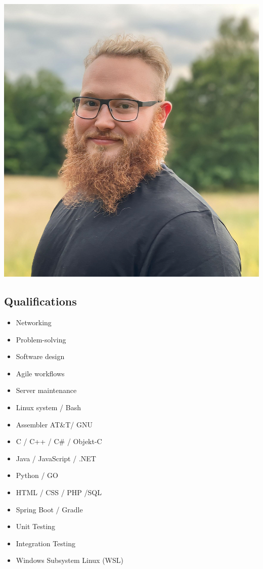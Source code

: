 \documentclass{article}
\begin{document}
	\begin{minipage}[t]{0.28\textwidth}
		\begin{minipage}[t]{0.8\textwidth}
			\vspace{-140pt} %
			\includegraphics[width=\linewidth]{../../me-s.png}
			\label{fig:bild}
		\end{minipage}
		\vspace{-10pt} %
		\subsection*{\textcolor{colorBlue}{Qualifications}}
		\begin{itemize}
			\item Networking
			\item Problem-solving
			\item Software design
			\item Agile workflows
			\item Server maintenance
			\item Linux system / Bash
			\item Assembler AT\&T/ GNU
			\item C / C++ / C\# / Objekt-C
			\item Java / JavaScript / .NET
			\item Python / GO
			\item HTML / CSS / PHP /SQL
			\item Spring Boot / Gradle
			\item Unit Testing
			\item Integration Testing
			\item Windows Subsystem Linux (WSL)
		\end{itemize}
		\vspace{-10pt} %

\end{minipage}
\end{document}
